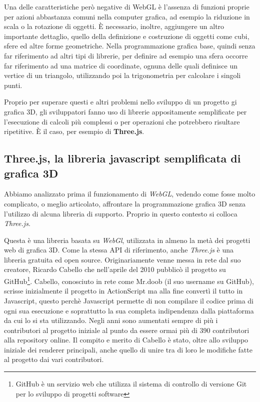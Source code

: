 Una delle caratteristiche però negative di WebGL è l'assenza di funzioni proprie per azioni abbastanza comuni nella computer grafica, ad esempio la riduzione in scala o la rotazione di oggetti. È necessario, inoltre, aggiungere un altro importante dettaglio, quello della definizione e costruzione di oggetti come cubi, sfere ed altre forme geometriche. Nella programmazione grafica base, quindi senza far riferimento ad altri tipi di librerie, per definire ad esempio una sfera occorre far riferimento ad una matrice di coordinate, ognuna delle quali definisce un vertice di un triangolo, utilizzando poi la trigonometria per calcolare i singoli punti.

Proprio per superare questi e altri problemi nello sviluppo di un progetto gi grafica 3D, gli sviluppatori fanno uso di librerie appositamente semplificate per l'esecuzione di calcoli più complessi o per operazioni che potrebbero risultare ripetitive. È il caso, per esempio di \textbf{Three.js}.

\subsection{Three.js, la libreria javascript semplificata di grafica 3D}
Abbiamo analizzato prima il funzionamento di \textit{WebGL}, vedendo come fosse molto complicato, o meglio articolato, affrontare la programmazione grafica 3D senza l'utilizzo di alcuna libreria di supporto. Proprio in questo contesto si colloca \textit{Three.js}. 

Questa è una libreria basata su \textit{WebGl}, utilizzata in almeno la metà dei progetti web di grafica 3D. Come la stessa API di riferimento, anche \textit{Three.js} è una libreria gratuita ed open source. Originariamente venne messa in rete dal suo creatore, Ricardo Cabello che nell'aprile del 2010 pubblicò il progetto su GitHub\footnote{GitHub è un servizio web che utilizza il sistema di controllo di versione Git per lo sviluppo di progetti software}. Cabello, conosciuto in rete come Mr.doob (il suo username su GitHub), scrisse inizialmente il progetto in ActionScript\cite{wiki:acs} ma alla fine convertì il tutto in Javascript, questo perchè Javascript permette di non compilare il codice prima di ogni sua esecuzione e soprattutto la sua completa indipendenza dalla piattaforma da cui lo si sta utilizzando. Negli anni sono aumentati sempre di più i contributori al progetto iniziale al punto da essere ormai più di 390 contributori alla repository online. Il compito e merito di Cabello è stato, oltre allo sviluppo iniziale dei renderer principali, anche quello di unire tra di loro le modifiche fatte al progetto dai vari contributori.

